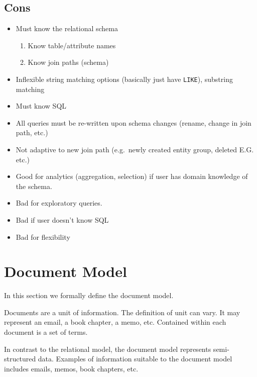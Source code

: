 		\subsection{Cons}
			\begin{itemize}
				\item Must know the relational schema
					\begin{enumerate}
						\item Know table/attribute names
						\item Know join paths (schema)
					\end{enumerate}
				\item Inflexible string matching options  (basically just have \texttt{LIKE}), substring matching
				\item Must know SQL
				\item All queries must be re-written upon schema changes (rename, change in join path, etc.)
				\item Not adaptive to new join path (e.g.\ newly created entity group, deleted E.G.\, etc.)
			\end{itemize}
	
		\begin{itemize}
			\item Good for analytics (aggregation, selection) if user has domain knowledge of the schema.
			\item Bad for exploratory queries.
			\item Bad if user doesn't know SQL
			\item Bad for flexibility
		\end{itemize}

\section{Document Model}
	In this section we formally define the document model.
	
	Documents are a unit of information.  The definition of unit can vary.  It may represent an email, a book chapter, a memo, etc.  Contained within each document is a set of terms.
	
	In contrast to the relational model, the document model represents semi-structured data.  Examples of information suitable to the document model includes emails, memos, book chapters, etc.
	
